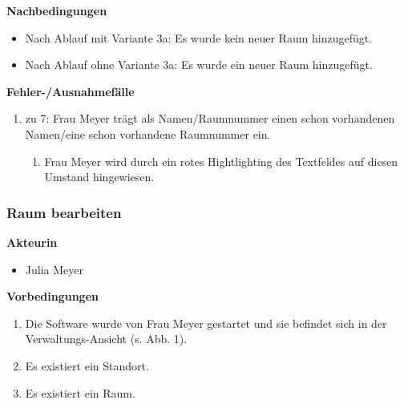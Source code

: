 \documentclass[fontsize=12pt,paper=a4,twoside]{scrartcl}
\begin{document}
\textbf{Nachbedingungen}
\begin{itemize}
\item Nach Ablauf mit Variante 3a: Es wurde kein neuer Raum hinzugefügt.
\item Nach Ablauf ohne Variante 3a: Es wurde ein neuer Raum hinzugefügt.
\end{itemize}
\vspace{5pt}

\textbf{Fehler-/Ausnahmefälle}
\begin{enumerate}
\item zu 7: Frau Meyer trägt als Namen/Raumnummer einen schon vorhandenen Namen/eine schon vorhandene Raumnummer ein.
	\begin{enumerate}[label=\arabic*.]
	\item Frau Meyer wird durch ein rotes Hightlighting des Textfeldes auf diesen Umstand hingewiesen.
	\end{enumerate}
\end{enumerate}

\subsubsection{Raum bearbeiten}
\textbf{Akteurin}
\begin{itemize}
\item Julia Meyer
\end{itemize}
\vspace{5pt}

\textbf{Vorbedingungen}
\begin{enumerate}
\item Die Software wurde von Frau Meyer gestartet und sie befindet sich in der Verwaltungs-Ansicht (s. Abb. 1).
\item Es existiert ein Standort.
\item Es existiert ein Raum.
\end{enumerate}
\vspace{5pt}
\end{document}
